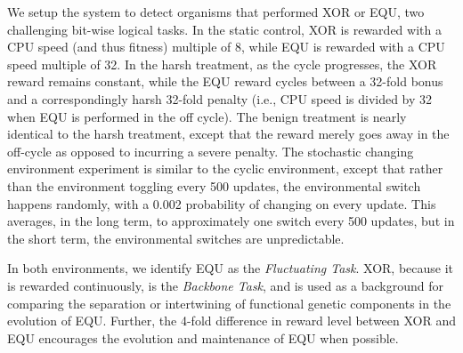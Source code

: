 \documentclass[letterpaper]{article}
\begin{document}
We setup the system to detect organisms that performed XOR or EQU, two challenging bit-wise logical tasks.
In the static control, %
XOR is rewarded with a CPU speed (and thus fitness) multiple of 8, while EQU is rewarded with a CPU speed multiple of 32. %
In the harsh treatment, as the cycle progresses, the XOR reward remains constant, while the EQU reward cycles between a 32-fold bonus and a correspondingly harsh 32-fold penalty (i.e., CPU speed is divided by 32 when EQU is performed in the off cycle). The benign treatment is nearly identical to the harsh treatment, except that the reward merely goes away in the off-cycle as opposed to incurring a severe penalty.
The stochastic changing environment experiment is similar to the cyclic environment, except that rather than the environment
toggling
every 500 updates, the environmental switch happens randomly, with a 0.002
probability of changing on every update. This averages, in the long term, to approximately one switch every 500 updates,
but in the short term, the environmental switches are unpredictable.

In both environments,%
we identify EQU as the \textit{Fluctuating Task}. XOR, because it is rewarded continuously, is the \textit{Backbone Task}, and is used as a background for comparing the separation or intertwining of functional genetic components in the evolution of EQU. Further, the 4-fold difference in reward level between XOR and EQU encourages the evolution and maintenance of EQU when possible.
\end{document}

